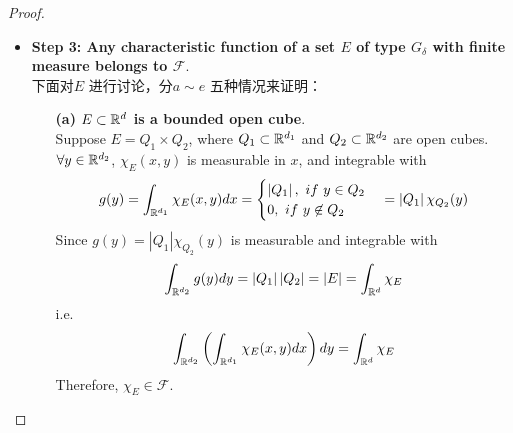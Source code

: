 \begin{proof}
\begin{itemize}
			\newpage
			
			\item \textbf{Step 3: Any characteristic function of a set $E$ of type $G_{\delta}$ with finite measure belongs to $\mathcal{F}$}. \\
			下面对$E$ 进行讨论，分$a \sim e$ 五种情况来证明：
			\vspace{2em}
			\begin{enumerate}
				\item[\textbf{(a)}]\textbf{$E \subset \mathbb{R}^d$ is a bounded open cube}. \\
				Suppose $E = Q_1 \times Q_2$, where $Q_1 \subset \mathbb{R}^{d_1}$ and $Q_2 \subset \mathbb{R}^{d_2}$ are open cubes. \\
				$\forall y \in \mathbb{R}^{d_2}$, $\chi_{E}(x , y)$ is measurable in $x$, and integrable with
				\begin{align}
					g(y) = \int_{\mathbb{R}^{d_1}}{\chi_{E}(x , y) dx} = 
					\begin{cases}
						\left|	Q_1 \right| , \,\, if \,\, y \in Q_2 \\
						0 , \,\, if \,\, y \not\in Q_2
					\end{cases}
					 = \left| Q_1 \right| \chi_{Q_2}(y)
				\end{align}
				Since $g(y) = \left| Q_1 \right| \chi_{Q_2}(y)$ is measurable and integrable with
				\begin{align}
					\int_{\mathbb{R}^{d_2}}{g(y) dy} = \left| Q_1 \right| \left| Q_2 \right| = \left| E \right| = \int_{\mathbb{R}^d}{\chi_E}
				\end{align}
				i.e.
				\begin{align}
					\int_{\mathbb{R}^{d_2}}{\left( \int_{\mathbb{R}^{d_1}}{\chi_{E}(x , y) dx} \right) dy} = \int_{\mathbb{R}^d}{\chi_E}
				\end{align}
				Therefore, $\chi_E \in \mathcal{F}$.
				
				\vspace{3em}
				

\end{enumerate}
\end{itemize}
\end{proof}
